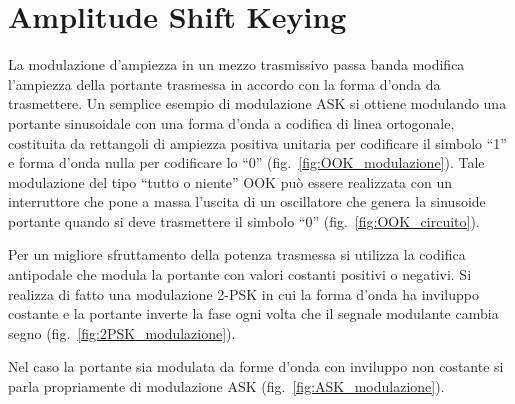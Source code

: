 \section{Amplitude Shift Keying}
La modulazione d'ampiezza in un mezzo trasmissivo passa banda modifica l'ampiezza della portante trasmessa in accordo con la forma d'onda da trasmettere. Un semplice esempio di modulazione \ac{ASK} si ottiene modulando una portante sinusoidale con una forma d'onda a codifica di linea ortogonale, costituita da rettangoli di ampiezza positiva unitaria per codificare il simbolo “1” e forma d'onda nulla per codificare lo “0” (fig.~\ref{fig:OOK_modulazione}). Tale modulazione del tipo “tutto o niente” \ac{OOK} può essere realizzata con un interruttore che pone a massa l'uscita di un oscillatore che genera la sinusoide portante quando si deve trasmettere il simbolo “0” (fig.~\ref{fig:OOK_circuito}).

Per un migliore sfruttamento della potenza trasmessa si utilizza la codifica antipodale che modula la portante con valori costanti positivi o negativi. Si realizza di fatto una modulazione 2-\ac{PSK} in cui la forma d'onda ha inviluppo costante e la portante inverte la fase ogni volta che il segnale modulante cambia segno (fig.~\ref{fig:2PSK_modulazione}).

Nel caso la portante sia modulata da forme d'onda con inviluppo non costante si parla propriamente di modulazione \ac{ASK} (fig.~\ref{fig:ASK_modulazione}).

